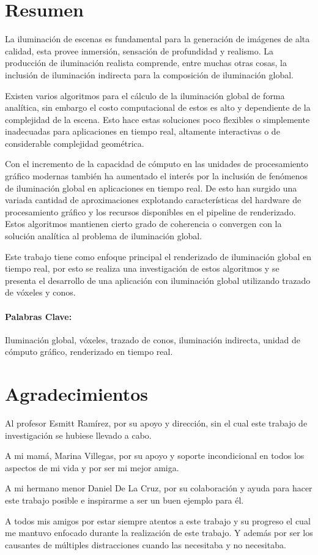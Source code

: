 \section*{Resumen}
La iluminación de escenas es fundamental para la generación de imágenes de alta calidad, esta provee inmersión, sensación de profundidad y realismo. La producción de iluminación realista comprende, entre muchas otras cosas, la inclusión de iluminación indirecta para la composición de iluminación global.

Existen varios algoritmos para el cálculo de la iluminación global de forma analítica, sin embargo el costo computacional de estos es alto y dependiente de la complejidad de la escena. Esto hace estas soluciones poco flexibles o simplemente inadecuadas para aplicaciones en tiempo real, altamente interactivas o de considerable complejidad geométrica. 

Con el incremento de la capacidad de cómputo en las unidades de procesamiento gráfico modernas también ha aumentado el interés por la inclusión de fenómenos de iluminación global en aplicaciones en tiempo real. De esto han surgido una variada cantidad de aproximaciones explotando características del hardware de procesamiento gráfico y los recursos disponibles en el pipeline de renderizado. Estos algoritmos mantienen cierto grado de coherencia o convergen con la solución analítica al problema de iluminación global. 

Este trabajo tiene como enfoque principal el renderizado de iluminación global en tiempo real, por esto se realiza una investigación de estos algoritmos y se presenta el desarrollo de una aplicación con iluminación global utilizando trazado de vóxeles y conos.
\paragraph{Palabras Clave:}
Iluminación global, vóxeles, trazado de conos, iluminación indirecta, unidad de cómputo gráfico, renderizado en tiempo real.

\newpage
\section*{Agradecimientos}

Al profesor Esmitt Ramírez, por su apoyo y dirección, sin el cual este trabajo de investigación se hubiese llevado a cabo.

A mi mamá, Marina Villegas, por su apoyo y soporte incondicional en todos los aspectos de mi vida y por ser mi mejor amiga. 

A mi hermano menor Daniel De La Cruz, por su colaboración y ayuda para hacer este trabajo posible e inspirarme a ser un buen ejemplo para él.

A todos mis amigos por estar siempre atentos a este trabajo y su progreso el cual me mantuvo enfocado durante la realización de este trabajo. Y además por ser los causantes de múltiples distracciones cuando las necesitaba y no necesitaba.